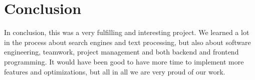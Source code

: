 \section{Conclusion}
In conclusion, this was a very fulfilling and interesting project. We learned a lot in the process about search engines and text processing, but also about software engineering, teamwork, project management and both backend and frontend programming. It would have been good to have more time to implement more features and optimizations, but all in all we are very proud of our work.
